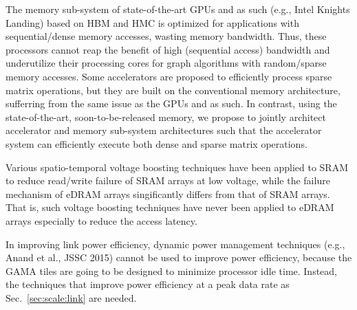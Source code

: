 \noindent
The memory sub-system of state-of-the-art GPUs and as such (e.g., Intel Knights Landing) based on HBM and HMC is optimized for applications with sequential/dense memory accesses, wasting memory bandwidth.
Thus, these processors cannot reap the benefit of high (sequential access) bandwidth and underutilize their processing cores for graph algorithms with random/sparse memory accesses.
Some accelerators are proposed to efficiently process sparse matrix operations, but they are built on the conventional memory architecture, sufferring from the same issue as the GPUs and as such.
In contrast, using the state-of-the-art, soon-to-be-released memory, we propose to jointly architect accelerator and memory sub-system architectures 
such that the accelerator system can efficiently execute both dense and sparse matrix operations.

Various spatio-temporal voltage boosting techniques have been applied to SRAM to reduce read/write failure of SRAM arrays at low voltage, while the failure mechanism of eDRAM arrays singificantly differs from that of SRAM arrays.
That is, such voltage boosting techniques have never been applied to eDRAM arrays especially to reduce the access latency.

In improving link power efficiency, dynamic power management techniques (e.g., Anand et al., JSSC 2015) cannot be used to improve power efficiency, because the GAMA tiles are going to be designed to minimize processor idle time. 
Instead, the techniques that improve power efficiency at a peak data rate as Sec.~\ref{sec:scale:link} are needed.

